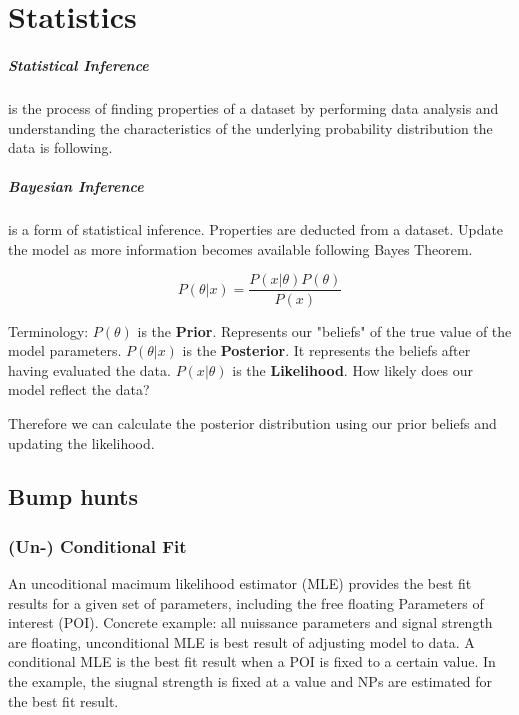 \chapter[Statistics]{Statistics}
\label{ch:statistics}

\paragraph{Statistical Inference}
is the process of finding properties of a dataset by performing data analysis 
and understanding the characteristics of the underlying probability distribution 
the data is following.

\paragraph{Bayesian Inference} is a form of statistical inference. Properties are deducted from a dataset. 
Update the model as more information becomes available following Bayes Theorem.

$$
P(\theta|x)=\frac{P(x|\theta)P(\theta)}{P(x)}    
$$

Terminology:
$P(\theta)$ is the \textbf{Prior}. Represents our "beliefs" of the true value of the model parameters.
$P(\theta|x)$ is the \textbf{Posterior}. It represents the beliefs after having evaluated the data.
$P(x|\theta)$ is the \textbf{Likelihood}. How likely does our model reflect the data?

Therefore we can calculate the posterior distribution using our prior beliefs and updating the likelihood. 




\section{Bump hunts}

\subsection{(Un-) Conditional Fit}
An uncoditional macimum likelihood estimator (MLE) provides the best fit results
for a given set of parameters, including the free floating Parameters of
interest (POI). Concrete example: all nuissance parameters and signal strength are
floating, unconditional MLE is best result of adjusting model to data.
A conditional MLE is the best fit result when a POI is fixed to a certain value.
In the example, the siugnal strength is fixed at a value and NPs are estimated
for the best fit result.


